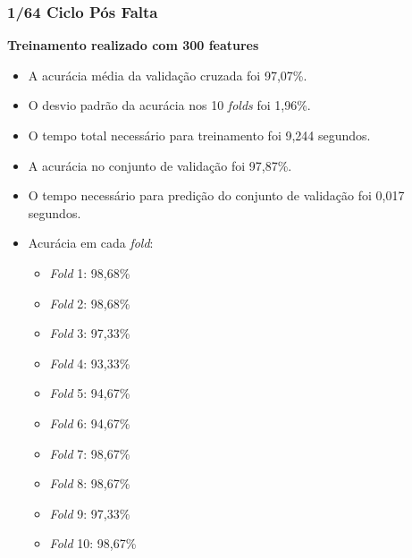 \subsubsection{1/64 Ciclo Pós Falta}
\textbf{Treinamento realizado com 300 features}
\begin{itemize}
    \item A acurácia média da validação cruzada foi 97,07\%.
    \item O desvio padrão da acurácia nos 10 \textit{folds} foi 1,96\%.
    \item O tempo total necessário para treinamento foi 9,244 segundos.
    \item A acurácia no conjunto de validação foi 97,87\%.
    \item O tempo necessário para predição do conjunto de validação foi 0,017 segundos.
    \item Acurácia em cada \textit{fold}:
    \begin{itemize}
        \item \textit{Fold} 1: 98,68\%
        \item \textit{Fold} 2: 98,68\%
        \item \textit{Fold} 3: 97,33\%
        \item \textit{Fold} 4: 93,33\%
        \item \textit{Fold} 5: 94,67\%
        \item \textit{Fold} 6: 94,67\%
        \item \textit{Fold} 7: 98,67\%
        \item \textit{Fold} 8: 98,67\%
        \item \textit{Fold} 9: 97,33\%
        \item \textit{Fold} 10: 98,67\%
    \end{itemize}
\end{itemize}

